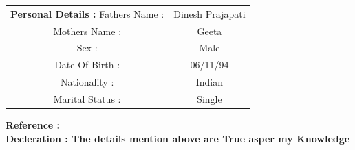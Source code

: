 \documentclass[a4paper]{article}
\begin{document}
\begin{flushleft}
\begin{tabular}{ cc }
\textbf {Personal Details :  }
 \hfill Fathers Name : & Dinesh Prajapati  \\ 
 \hfill Mothers Name : & Geeta \\  
 \hfill Sex : & Male   \\ 
 \hfill Date Of Birth : & 06/11/94  \\
 \hfill Nationality : & Indian  \\
 \hfill Marital Status : & Single
\end{tabular}
\end{flushleft}


\begin{flushleft}
\textbf {Reference :  }\\
\textbf {Decleration : The details mention above are True asper my Knowledge   }\\
\end{flushleft}
\end{document}
